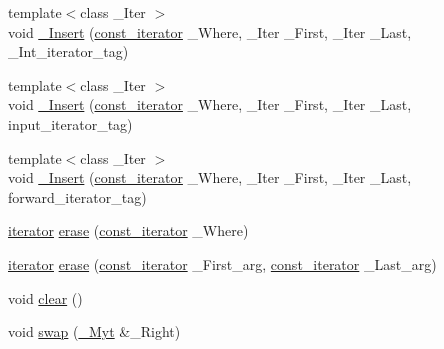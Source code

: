 \begin{DoxyCompactItemize}
\item 
{\footnotesize template$<$class \+\_\+\+Iter $>$ }\\void \hyperlink{classvector_a18b93a6644080bb543c9aff2d041ea97}{\+\_\+\+Insert} (\hyperlink{classvector_abed2910558c61a5a17113b2d250994da}{const\+\_\+iterator} \+\_\+\+Where, \+\_\+\+Iter \+\_\+\+First, \+\_\+\+Iter \+\_\+\+Last, \+\_\+\+Int\+\_\+iterator\+\_\+tag)
\item 
{\footnotesize template$<$class \+\_\+\+Iter $>$ }\\void \hyperlink{classvector_a45db786cdafa1273cd1f605426f8f0c2}{\+\_\+\+Insert} (\hyperlink{classvector_abed2910558c61a5a17113b2d250994da}{const\+\_\+iterator} \+\_\+\+Where, \+\_\+\+Iter \+\_\+\+First, \+\_\+\+Iter \+\_\+\+Last, input\+\_\+iterator\+\_\+tag)
\item 
{\footnotesize template$<$class \+\_\+\+Iter $>$ }\\void \hyperlink{classvector_abc90508f0d68ec762eec41b5824f4e9d}{\+\_\+\+Insert} (\hyperlink{classvector_abed2910558c61a5a17113b2d250994da}{const\+\_\+iterator} \+\_\+\+Where, \+\_\+\+Iter \+\_\+\+First, \+\_\+\+Iter \+\_\+\+Last, forward\+\_\+iterator\+\_\+tag)
\item 
\hyperlink{classvector_a5a7a542bca0f55f43e161bd5a09c483d}{iterator} \hyperlink{classvector_a4e9ff386d2bbdf9b6360fa8106139073}{erase} (\hyperlink{classvector_abed2910558c61a5a17113b2d250994da}{const\+\_\+iterator} \+\_\+\+Where)
\item 
\hyperlink{classvector_a5a7a542bca0f55f43e161bd5a09c483d}{iterator} \hyperlink{classvector_ad17b00c67398fd746359b1caa55b5348}{erase} (\hyperlink{classvector_abed2910558c61a5a17113b2d250994da}{const\+\_\+iterator} \+\_\+\+First\+\_\+arg, \hyperlink{classvector_abed2910558c61a5a17113b2d250994da}{const\+\_\+iterator} \+\_\+\+Last\+\_\+arg)
\item 
void \hyperlink{classvector_a51da9039663bda99118fa35aace9ae9c}{clear} ()
\item 
void \hyperlink{classvector_ada1f77df63cd9cf53ff2109c9dcb5ee0}{swap} (\hyperlink{classvector_ae499c665535254a7364e3a219b780112}{\+\_\+\+Myt} \&\+\_\+\+Right)
\end{DoxyCompactItemize}
